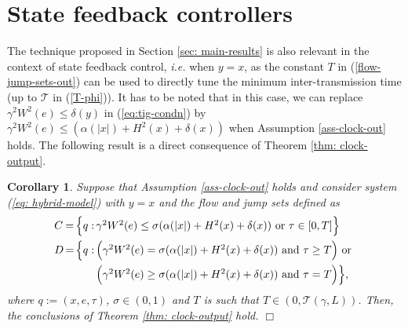 \documentclass[a4paper, 9pt, twocolumn]{IEEEtran}
\theoremstyle{plain}
\newtheorem{cor}{Corollary}
\theoremstyle{definition}
\begin{document}
\section{State feedback controllers}\label{sec: linear-state-feedback}
The technique proposed in Section \ref{sec: main-results} is also relevant in the context of state feedback control, \textit{i.e.} when $y = x$, as the constant $T$ in (\ref{flow-jump-sets-out}) can be used to directly tune the minimum inter-transmission time (up to $\mathcal{T}$ in (\ref{T-phi})). It has to be noted that in this case, we can replace $\gamma^{2} W^{2}(e) \leq \delta(y)$ in (\ref{eq:tig-condn}) by $\gamma^{2} W^{2}(e) \leq (\alpha(|x|) + H^{2}(x) + \delta(x))$ when Assumption \ref{ass-clock-out} holds. The following result is a direct consequence of Theorem \ref{thm: clock-output}.
\begin{cor}
Suppose that Assumption \ref{ass-clock-out} holds and consider system (\ref{eq: hybrid-model}) with $y=x$ and the flow and jump sets defined as
\begin{equation}
\arraycolsep=0.8pt\def\arraystretch{1.3}
\begin{array}{lcll}
C &=& \Big\{q: &\gamma^{2} W^{2}(e) \leq \sigma(\alpha(|x|) + H^{2}(x) + \delta(x)) \text{ or } \tau \in [0,T]\Big\} \\[6pt]
D &=& \Big\{q: &\Big(\gamma^{2} W^{2}(e) = \sigma(\alpha(|x|) + H^{2}(x) + \delta(x)) \text{ and } \tau \geq T\Big) \text{ or } \\[6pt]
& & & \Big(\gamma^{2} W^{2}(e) \geq \sigma(\alpha(|x|) + H^{2}(x) + \delta(x)) \text{ and } \tau = T\Big) \Big\},
\end{array}
\end{equation}
where $q := (x,e,\tau)$, $\sigma \in (0,1)$ and $T$ is such that $T \in (0,\mathcal{T}(\gamma, L))$. Then, the conclusions of Theorem \ref{thm: clock-output} hold.
\hfill $\Box$
\end{cor}
\end{document}
